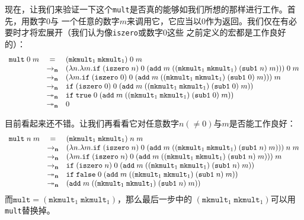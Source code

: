 \documentclass[12pt]{article}
\begin{document}
\indent{}现在，让我们来验证一下这个\texttt{mult}是否真的能够如我们所想的那样进行工作。首先，用数字0与
一个任意的数字$m$来调用它，它应当以0作为返回。我们仅在有必要时才将宏展开（我们认为像\texttt{iszero}或数字0这些
之前定义的宏都是工作良好的）：
\begin{gather*}
\begin{array}{lcl}
\texttt{mult}\;0\;m
& = & (\texttt{mkmult}_1\;\texttt{mkmult}_1)\;0\;m\\
& \rightarrow_{\bf{n}} & (\lambda{}n.\lambda{}m.\texttt{if}\;
(\texttt{iszero}\;n)\;0\;(\texttt{add}\;m\;((\texttt{mkmult}_1\;\texttt{mkmult}_1)\;(\texttt{sub1}\;n)\;m)))\;0\;m\\
& \rightarrow_{\bf{n}} & (\lambda{}m.\texttt{if}\;
(\texttt{iszero}\;0)\;0\;(\texttt{add}\;m\;((\texttt{mkmult}_1\;\texttt{mkmult}_1)\;(\texttt{sub1}\;0)\;m)))\;m\\
& \rightarrow_{\bf{n}} & \texttt{if}\;
(\texttt{iszero}\;0)\;0\;(\texttt{add}\;m\;((\texttt{mkmult}_1\;\texttt{mkmult}_1)\;(\texttt{sub1}\;0)\;m))\\
& \twoheadrightarrow_{\bf{n}} & \texttt{if}\;
\texttt{true}\;0\;(\texttt{add}\;m\;((\texttt{mkmult}_1\;\texttt{mkmult}_1)\;(\texttt{sub1}\;0)\;m))\\
& \twoheadrightarrow_{\bf{n}} & 0
\end{array}
\end{gather*}

\indent{}目前看起来还不错。让我们再看看它对任意数字$n(\neq{}0)$与$m$是否能工作良好：
\begin{gather*}
\begin{array}{lcl}
\texttt{mult}\;n\;m
& = & (\texttt{mkmult}_1\;\texttt{mkmult}_1)\;n\;m\\
& \rightarrow_{\bf{n}} & (\lambda{}n.\lambda{}m.\texttt{if}\;
(\texttt{iszero}\;n)\;0\;(\texttt{add}\;m\;((\texttt{mkmult}_1\;\texttt{mkmult}_1)\;(\texttt{sub1}\;n)\;m)))\;n\;m\\
& \rightarrow_{\bf{n}} & (\lambda{}m.\texttt{if}\;
(\texttt{iszero}\;n)\;0\;(\texttt{add}\;m\;((\texttt{mkmult}_1\;\texttt{mkmult}_1)\;(\texttt{sub1}\;n)\;m)))\;m\\
& \rightarrow_{\bf{n}} & \texttt{if}\;
(\texttt{iszero}\;n)\;0\;(\texttt{add}\;m\;((\texttt{mkmult}_1\;\texttt{mkmult}_1)\;(\texttt{sub1}\;n)\;m))\\
& \twoheadrightarrow_{\bf{n}} & \texttt{if}\;
\texttt{false}\;0\;(\texttt{add}\;m\;((\texttt{mkmult}_1\;\texttt{mkmult}_1)\;(\texttt{sub1}\;n)\;m))\\
& \twoheadrightarrow_{\bf{n}} &
(\texttt{add}\;m\;((\texttt{mkmult}_1\;\texttt{mkmult}_1)\;(\texttt{sub1}\;n)\;m))
\end{array}
\end{gather*}
\noindent{}而$\texttt{mult}=(\texttt{mkmult}_1\;\texttt{mkmult}_1)$，那么最后一步中的
$(\texttt{mkmult}_1\;\texttt{mkmult}_1)$可以用\texttt{mult}替换掉。
\end{document}
